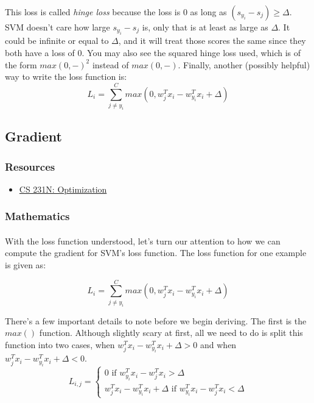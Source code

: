 \documentclass[12pt]{article}
\begin{document}
This loss is called \emph{hinge loss} because the loss is 0 as long as 
$(s_{y_i} - s_j) \geq \Delta$. SVM doesn't care how large $s_{y_i} - s_j$ is, 
only that is at least as large as $\Delta$. It could be infinite or equal to $\Delta$,
and it will treat those scores the same since they both have a loss of 0. You may 
also see the squared hinge loss used, which is of the form $max(0, -)^2$ instead 
of $max(0, -)$. Finally, another (possibly helpful) way to write the loss function is: 
\begin{equation}
    L_{i} = \sum_{j \neq y_{i}}^C max(0, w_{j}^T x_i - w_{y_i}^T x_i + \Delta)
\end{equation}


\subsection{Gradient}

\subsubsection{Resources}
\begin{itemize}
    \item \href{https://cs231n.github.io/optimization-1/#gd}{CS 231N: Optimization}
\end{itemize}

\subsubsection{Mathematics}

\paragraph{}
With the loss function understood, let's turn our attention to how we can compute 
the gradient for SVM's loss function. The loss function for one example is given as: 

\begin{equation}
    L_i = \sum_{j \neq y_i}^{C} max(0, w_j^T x_i - w_{y_i}^T x_i + \Delta)
\end{equation}

\noindent There's a few important details to note before we begin deriving. The 
first is the $max()$ function. Although slightly scary at first, all we need to 
do is split this function into two cases, when $w_j^T x_i - w_{y_i}^T x_i + \Delta > 0$
and when $w_j^T x_i - w_{y_i}^T x_i + \Delta < 0$. 
\begin{equation}
    L_{i, j} = 
    \begin{cases}
        0 \text{ if } w_{y_i}^T x_i - w_j^T x_i > \Delta\\
        w_j^T x_i - w_{y_i}^T x_i + \Delta \text{ if } w_{y_i}^T x_i - w_j^T x_i < \Delta
    \end{cases} 
\end{equation}
\end{document}
